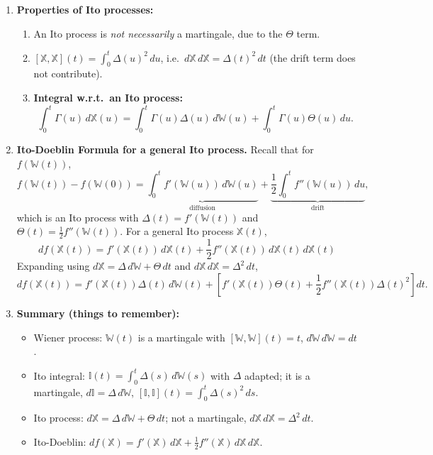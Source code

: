 \begin{enumerate}
    \item \textbf{Properties of Ito processes:}
    \begin{enumerate}
        \item An Ito process is \textit{not necessarily} a martingale, due to the $\Theta$ term.
        \item $[\mathbb{X}, \mathbb{X}](t) = \int_0^t \Delta(u)^2\, du$, i.e.\ $d\mathbb{X}\, d\mathbb{X} = \Delta(t)^2\, dt$ (the drift term does not contribute).
        \item \textbf{Integral w.r.t.\ an Ito process:}
        \[\int_0^t \Gamma(u)\, d\mathbb{X}(u) = \int_0^t \Gamma(u)\Delta(u)\, d\mathbb{W}(u) + \int_0^t \Gamma(u)\Theta(u)\, du.\]
    \end{enumerate}

    \item \textbf{Ito-Doeblin Formula for a general Ito process.} Recall that for $f(\mathbb{W}(t))$,
    \[f(\mathbb{W}(t)) - f(\mathbb{W}(0)) = \underbrace{\int_0^t f'(\mathbb{W}(u))\, d\mathbb{W}(u)}_{\text{diffusion}} + \underbrace{\frac{1}{2}\int_0^t f''(\mathbb{W}(u))\, du}_{\text{drift}},\]
    which is an Ito process with $\Delta(t) = f'(\mathbb{W}(t))$ and $\Theta(t) = \frac{1}{2}f''(\mathbb{W}(t))$. For a general Ito process $\mathbb{X}(t)$,
    \[\boxed{df(\mathbb{X}(t)) = f'(\mathbb{X}(t))\, d\mathbb{X}(t) + \frac{1}{2}f''(\mathbb{X}(t))\, d\mathbb{X}(t)\, d\mathbb{X}(t)}\]
    Expanding using $d\mathbb{X} = \Delta\, d\mathbb{W} + \Theta\, dt$ and $d\mathbb{X}\, d\mathbb{X} = \Delta^2\, dt$,
    \[df(\mathbb{X}(t)) = f'(\mathbb{X}(t))\Delta(t)\, d\mathbb{W}(t) + \left[f'(\mathbb{X}(t))\Theta(t) + \frac{1}{2}f''(\mathbb{X}(t))\Delta(t)^2\right]dt.\]

    \item \textbf{Summary (things to remember):}
    \begin{itemize}
        \item Wiener process: $\mathbb{W}(t)$ is a martingale with $[\mathbb{W}, \mathbb{W}](t) = t$, $d\mathbb{W}\, d\mathbb{W} = dt$.
        \item Ito integral: $\mathbb{I}(t) = \int_0^t \Delta(s)\, d\mathbb{W}(s)$ with $\Delta$ adapted; it is a martingale, $d\mathbb{I} = \Delta\, d\mathbb{W}$, $[\mathbb{I}, \mathbb{I}](t) = \int_0^t \Delta(s)^2\, ds$.
        \item Ito process: $d\mathbb{X} = \Delta\, d\mathbb{W} + \Theta\, dt$; not a martingale, $d\mathbb{X}\, d\mathbb{X} = \Delta^2\, dt$.
        \item Ito-Doeblin: $df(\mathbb{X}) = f'(\mathbb{X})\, d\mathbb{X} + \frac{1}{2}f''(\mathbb{X})\, d\mathbb{X}\, d\mathbb{X}$.
    \end{itemize}

\end{enumerate}
